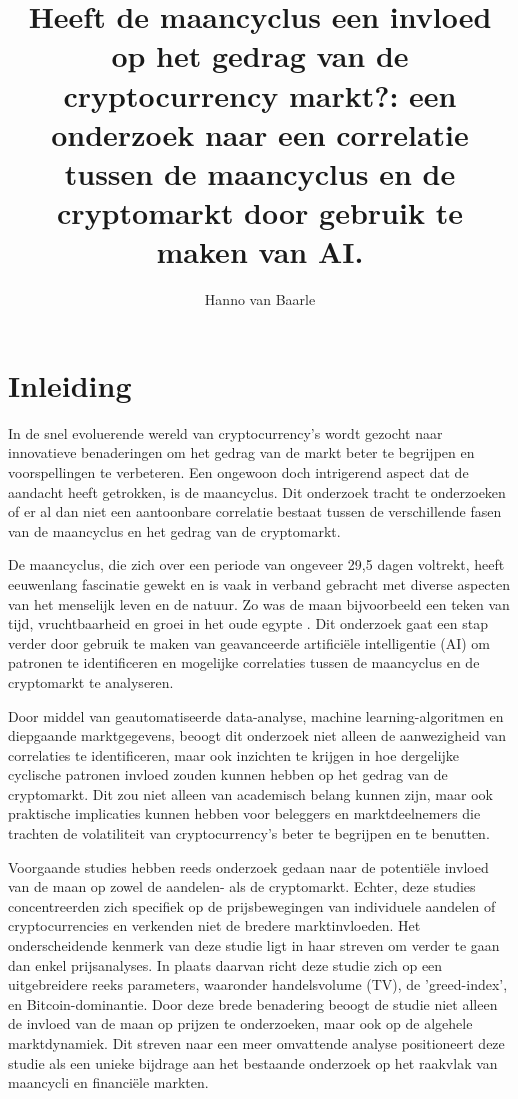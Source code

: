 \documentclass{hogent-article}
\title{Heeft de maancyclus een invloed op het gedrag van de cryptocurrency markt?: een onderzoek naar een correlatie tussen de maancyclus en de cryptomarkt door gebruik te maken van AI.}
\author{Hanno van Baarle}
\begin{document}
\begin{abstract}
\end{abstract}

\tableofcontents

\section{Inleiding}%
\label{sec:inleiding}

In de snel evoluerende wereld van cryptocurrency's wordt gezocht naar innovatieve benaderingen om het gedrag van de markt beter te begrijpen en voorspellingen te verbeteren. Een ongewoon doch intrigerend aspect dat de aandacht heeft getrokken, is de maancyclus. Dit onderzoek tracht te onderzoeken of er al dan niet een aantoonbare correlatie bestaat tussen de verschillende fasen van de maancyclus en het gedrag van de cryptomarkt.

De maancyclus, die zich over een periode van ongeveer 29,5 dagen voltrekt, heeft eeuwenlang fascinatie gewekt en is vaak in verband gebracht met diverse aspecten van het menselijk leven en de natuur. Zo was de maan bijvoorbeeld een teken van tijd, vruchtbaarheid en groei in het oude egypte \cite{MoonCraterTycho2023}. Dit onderzoek gaat een stap verder door gebruik te maken van geavanceerde artificiële intelligentie (AI) om patronen te identificeren en mogelijke correlaties tussen de maancyclus en de cryptomarkt te analyseren.

Door middel van geautomatiseerde data-analyse, machine learning-algoritmen en diepgaande marktgegevens, beoogt dit onderzoek niet alleen de aanwezigheid van correlaties te identificeren, maar ook inzichten te krijgen in hoe dergelijke cyclische patronen invloed zouden kunnen hebben op het gedrag van de cryptomarkt. Dit zou niet alleen van academisch belang kunnen zijn, maar ook praktische implicaties kunnen hebben voor beleggers en marktdeelnemers die trachten de volatiliteit van cryptocurrency's beter te begrijpen en te benutten.

Voorgaande studies hebben reeds onderzoek gedaan naar de potentiële invloed van de maan op zowel de aandelen- als de cryptomarkt. Echter, deze studies concentreerden zich specifiek op de prijsbewegingen van individuele aandelen of cryptocurrencies en verkenden niet de bredere marktinvloeden. Het onderscheidende kenmerk van deze studie ligt in haar streven om verder te gaan dan enkel prijsanalyses. In plaats daarvan richt deze studie zich op een uitgebreidere reeks parameters, waaronder handelsvolume (TV), de 'greed-index', en Bitcoin-dominantie. Door deze brede benadering beoogt de studie niet alleen de invloed van de maan op prijzen te onderzoeken, maar ook op de algehele marktdynamiek. Dit streven naar een meer omvattende analyse positioneert deze studie als een unieke bijdrage aan het bestaande onderzoek op het raakvlak van maancycli en financiële markten.
\end{document}
